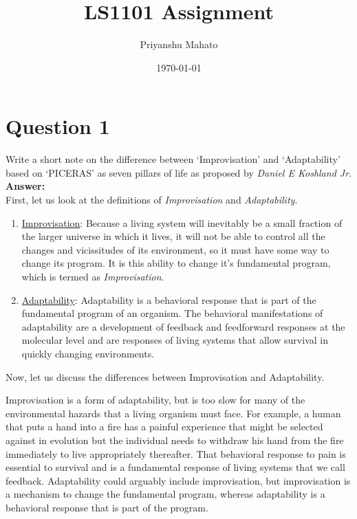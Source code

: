 \documentclass[11pt]{scrartcl}
\begin{document}
	\title{\color{ChadBlue}LS1101 Assignment}
	\author{\color{ChadRoyal}Priyanshu Mahato}
	\date{\today}
	\maketitle
	
	\section{Question 1}
	
	Write a short note on the difference between ‘Improvisation’ and ‘Adaptability’ based on ‘PICERAS’ as seven pillars of life as proposed by \emph{Daniel E Koshland Jr.}\\[2pt]
	
	\textbf{Answer:}\\[2pt]
	
	First, let us look at the definitions of \emph{Improvisation} and \emph{Adaptability}.
	\begin{enumerate}
		\item \underline{Improvisation}: Because a living system will inevitably be a small fraction of the larger
		universe in which it lives, it will not be
		able to control all the changes and vicissitudes of its environment, so it must have
		some way to change its program. It is this ability to change it's fundamental program, which is termed as \emph{Improvisation}.
		
		\item \underline{Adaptability}: Adaptability is a behavioral response that is part of the fundamental program of an organism. The behavioral manifestations of adaptability are a development of feedback and feedforward responses at the molecular level and are responses of living systems that allow survival in quickly changing environments.  
		
		\end{enumerate}
		
		Now, let us discuss the differences between Improvisation and Adaptability.
		
		Improvisation is a form of adaptability, but is too
		slow for many of the environmental hazards that a living organism must face. For example, a human that puts a hand into a
		fire has a painful experience that might be selected against in evolution but the individual needs to withdraw his hand from
		the fire immediately to live appropriately thereafter. That behavioral response to pain is essential to survival and is a fundamental response of living systems that we call feedback.
		Adaptability could arguably include improvisation, but improvisation is a mechanism to change the fundamental program,
		whereas adaptability is a behavioral response that is part of the program.
		
\end{document}
